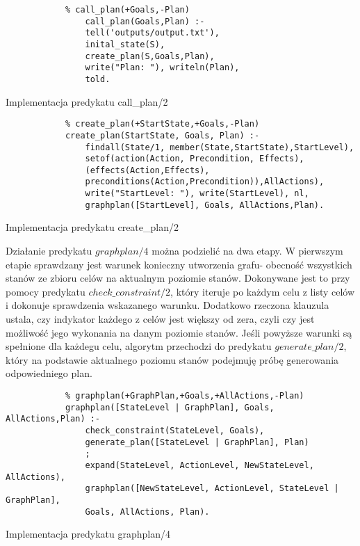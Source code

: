     \begin{listing}[H]
        \begin{verbatim}
            % call_plan(+Goals,-Plan)
                call_plan(Goals,Plan) :-
                tell('outputs/output.txt'),
                inital_state(S),
                create_plan(S,Goals,Plan),
                write("Plan: "), writeln(Plan),
                told.
        \end{verbatim}
        \caption{Implementacja predykatu call\_plan/2}
    \end{listing}

    \begin{listing}[H]
        \begin{verbatim}
            % create_plan(+StartState,+Goals,-Plan)
            create_plan(StartState, Goals, Plan) :-
                findall(State/1, member(State,StartState),StartLevel),
                setof(action(Action, Precondition, Effects), 
                (effects(Action,Effects),
                preconditions(Action,Precondition)),AllActions),
                write("StartLevel: "), write(StartLevel), nl,
                graphplan([StartLevel], Goals, AllActions,Plan).
    \end{verbatim}
    \caption{Implementacja predykatu create\_plan/2}
    \end{listing}

    Działanie predykatu $graphplan/4$ można podzielić na dwa etapy. W pierwszym etapie sprawdzany jest warunek konieczny utworzenia grafu- 
    obecność wszystkich stanów ze zbioru celów na aktualnym poziomie stanów. Dokonywane jest to przy pomocy predykatu $check\_constraint/2$, który 
    iteruje po każdym celu z listy celów i dokonuje sprawdzenia wskazanego warunku. Dodatkowo rzeczona klauzula ustala, czy indykator każdego z 
    celów jest większy od zera, czyli czy jest możliwość jego wykonania na danym poziomie stanów. Jeśli powyższe warunki są spełnione dla każdegu celu, 
    algorytm przechodzi do predykatu $generate\_plan/2$, który na podstawie aktualnego poziomu stanów 
    podejmuję próbę generowania odpowiedniego plan. 
    
    \begin{listing}[H]
        \begin{verbatim}
            % graphplan(+GraphPlan,+Goals,+AllActions,-Plan)
            graphplan([StateLevel | GraphPlan], Goals, AllActions,Plan) :-
                check_constraint(StateLevel, Goals),
                generate_plan([StateLevel | GraphPlan], Plan)
                ;
                expand(StateLevel, ActionLevel, NewStateLevel, AllActions),
                graphplan([NewStateLevel, ActionLevel, StateLevel | GraphPlan], 
                Goals, AllActions, Plan).
    \end{verbatim}
    \caption{Implementacja predykatu graphplan/4}
    \end{listing}
    
